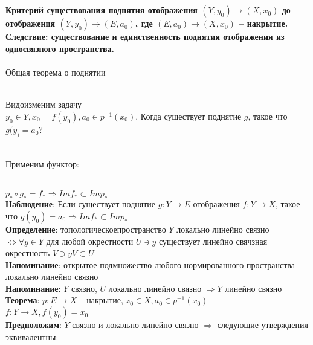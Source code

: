 \section{}
	\textbf{Критерий существования поднятия отображения $(Y, y_0) \rightarrow (X,x_0)$ до отображения $(Y, y_0) \rightarrow (E, a_0)$, где $(E, a_0) \rightarrow (X, x_0)$ -- накрытие. Следствие: существование и единственность поднятия отображения из односвязного пространства.}\\
	\\
	Общая теорема о поднятии\\
	\begin{figure}[h]
	\end{figure}\\
	Видоизменим задачу\\
	$y_0 \in Y, x_0 = f(y_0), a_0 \in p^{-1} (x_0)$. Когда существует поднятие $g$, такое что $g(y_) = a_0$?\\
	\begin{figure}[h]
	\end{figure}\\
	Применим функтор:\\
	\begin{figure}[h]
	\end{figure}\\
	$p_{\ast} \circ g_{\ast} = f_{\ast} \Rightarrow Im f_{\ast} \subset Im p_{\ast}$\\
	\textbf{Наблюдение}: Если существует поднятие $g: Y\rightarrow E$ отображения $f: Y\rightarrow X$, такое что $g(y_0) = a_0 \Rightarrow Im f_{\ast} \subset Im p_{\ast}$\\
	\textbf{Определение}: топологическоепространство $Y$ локально линейно связно $\Leftrightarrow \forall y\in Y$ для любой окрестности $U\ni y$ существует линейно свячзная окрестность $V\ni y V\subset U$\\
	\textbf{Напоминание}: открытое подмножество любого нормированного пространства локально линейно связно\\
	\textbf{Напоминание}: $Y$ связно, $U$ локально линейно связно $\Rightarrow Y$ линейно связно\\
	\textbf{Теорема}: $p: E\rightarrow X$ -- накрытие, $z_0 \in X, a_0 \in p^{-1} (x_0)$\\
	$f: Y \rightarrow X, f(y_0) = x_0$\\
	\textbf{Предположим}: $Y$ связно и локально линейно связно $\Rightarrow$ следующие утверждения эквивалентны:
